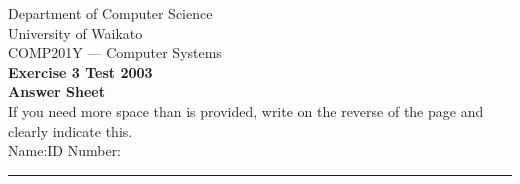 \documentclass[a4paper,10pt]{article}
\begin{document}
\clearpage
\newpage
\newpage
\newpage
\setcounter{page}{1} 

\vspace*{-1cm} 

{\centering
\Large 
Department of Computer Science\\
University of Waikato\\[5mm]
COMP201Y --- Computer Systems\\[5mm]
\bf Exercise 3 Test 2003\\
Answer Sheet\\[5mm]
}
If you need more space than is provided, write on the reverse of the
page and clearly indicate this.\\[5mm]
Name:\hspace*{5cm}ID Number:\\
\hrule
\end{document}
